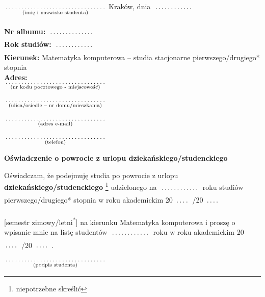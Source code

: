 \documentclass[a4paper,11pt]{article}
\newcommand{\fillField}[2]{
    $\underset{\text{#1}}{\parbox[t]{#2}{\dotfill}}$
}
\begin{document}
\noindent
\fillField{(imię i nazwisko studenta)}{5cm} \hfill Kraków, dnia \fillField{}{2cm} \\\\
\textbf{Nr albumu:}   \fillField{}{2.3cm}\\
\textbf{Rok studiów:} \fillField{}{2cm}\\
\textbf{Kierunek:} Matematyka komputerowa – studia stacjonarne pierwszego/drugiego* stopnia\\
\textbf{Adres:}\\
\fillField{(nr kodu pocztowego - miejscowość)}{5cm}\\\\
\fillField{(ulica/osiedle – nr domu/mieszkania)}{5cm}\\\\
\fillField{(adres e-mail)}{5cm}\\\\
\fillField{(telefon)}{5cm}



\vskip 2.0cm

\begin{center}
{\Large \textbf{Oświadczenie o powrocie z urlopu dziekańskiego/studenckiego}}
\end{center}

\vskip 0.5cm

Oświadczam, że podejmuję studia po powrocie z urlopu \textbf{dziekańskiego/studenckiego}
\footnote[1]{niepotrzebne skreślić} udzielonego na \fillField{}{2cm} roku studiów
pierwszego/drugiego* stopnia w roku akademickim 20\fillField{}{0.7cm}/20\fillField{}{0.7cm}
[semestr zimowy/letni\textsuperscript{*}] na kierunku Matematyka komputerowa i proszę o wpisanie
mnie na listę studentów \fillField{}{2cm} roku w roku
akademickim 20\fillField{}{0.7cm}/20\fillField{}{0.7cm}.

\vskip 2.0cm

\hspace{\fill} \fillField{(podpis studenta)}{5cm} \hspace{2.0cm}
\end{document}
